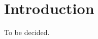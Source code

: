 \documentclass[../main.tex]{subfiles}
\begin{document}
\section{Introduction}\label{sec:intro}
To be decided.
\end{document}
